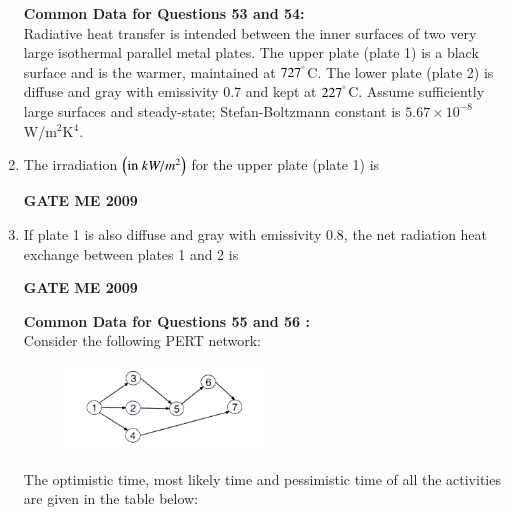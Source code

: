 \documentclass[journal]{IEEEtran}
\begin{document}
\begin{enumerate}[leftmargin=0pt]
\textbf{Common Data for Questions 53 and 54:}\\
Radiative heat transfer is intended between the inner surfaces of two very large isothermal parallel metal plates. The upper plate (plate 1) is a black surface and is the warmer, maintained at $727^{\degree}$C. The lower plate (plate 2) is diffuse and gray with emissivity 0.7 and kept at $227^{\degree}$C. Assume sufficiently large surfaces and steady-state; Stefan-Boltzmann constant is $5.67 \times 10^{-8}$ W/m$^2$K$^4$.
\item The irradiation $\left(\text{in}\  kW/m^2\right)$ for the upper plate (plate 1) is
\begin{enumerate}
\hfill{\textbf{GATE ME 2009}}
\end{enumerate}
\item If plate 1 is also diffuse and gray with emissivity 0.8, the net radiation heat exchange  between plates 1 and 2 is
\begin{enumerate}
\hfill{\textbf{GATE ME 2009}}
\end{enumerate}
\textbf{Common Data for Questions 55 and 56 :}\\
Consider the following PERT network:
\begin{figure}[h]
  \centering
  \includegraphics[width=0.5\textwidth]{Figs/image (12).png}
  \caption{}
\end{figure}
The optimistic time, most likely time and pessimistic time of all the activities are given in the table below:\\
\begin{table}[h]
    \centering
    
   

\end{table}
\end{enumerate}
\end{document}
